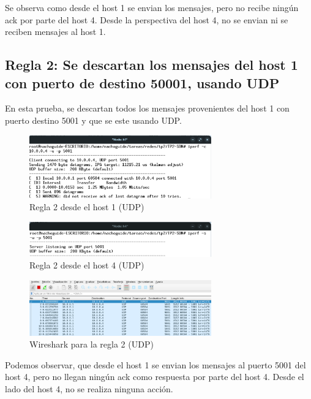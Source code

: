 \documentclass[titlepage,a4paper]{article}
\begin{document}
Se observa como desde el host 1 se envian los mensajes, pero no recibe ningún ack por parte del host 4.
Desde la perspectiva del host 4, no se envian ni se reciben mensajes al host 1.



\subsection{Regla 2: Se descartan los mensajes del host 1 con puerto de destino 50001, usando UDP}
En esta prueba, se descartan todos los mensajes provenientes del host 1 con puerto destino 5001 y que se este usando UDP.

\begin{figure}[H]
    \centering
    \includegraphics[width=0.7\textwidth]{img/regla2_h1_udp.png}
    \caption{Regla 2 desde el host 1 (UDP)}
\end{figure}

\begin{figure}[H]
    \centering
    \includegraphics[width=0.7\textwidth]{img/regla2_h4_udp.png}
    \caption{Regla 2 desde el host 4 (UDP)}
\end{figure}

\begin{figure}[H]
    \centering
    \includegraphics[width=0.7\textwidth]{img/regla2_wireshark_udp.png}
    \caption{Wireshark para la regla 2 (UDP)}
\end{figure}

Podemos observar, que desde el host 1 se envian los mensajes al puerto 5001 del host 4, pero no llegan ningún ack como respuesta por parte del host 4.
Desde el lado del host 4, no se realiza ninguna acción.
\end{document}
